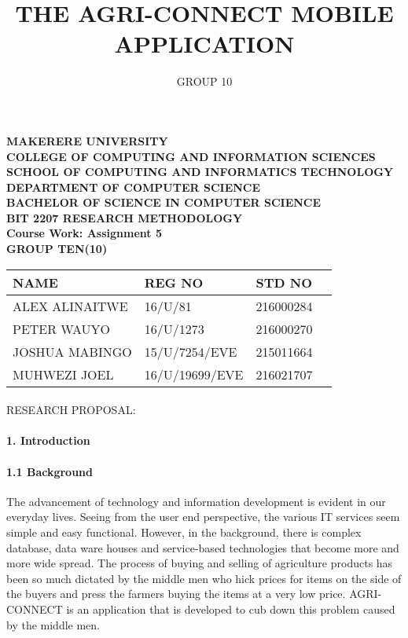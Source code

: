 \documentclass[10pt,a4paper]{report}
\author{GROUP 10}
\title{THE AGRI-CONNECT MOBILE APPLICATION}
\begin{document}
\begin{Huge}
\begin{center}
\begin{normalsize}
\textbf{MAKERERE UNIVERSITY }\\
\textbf{COLLEGE OF COMPUTING AND INFORMATION SCIENCES} \\
\textbf{SCHOOL OF COMPUTING AND INFORMATICS TECHNOLOGY} \\
\textbf{DEPARTMENT OF COMPUTER SCIENCE} \\
\textbf{BACHELOR OF SCIENCE IN COMPUTER SCIENCE} \\
\textbf{BIT 2207 RESEARCH METHODOLOGY} \\
\textbf{Course Work: Assignment 5}\\
\textbf{GROUP TEN(10)}
\end{normalsize}
\end{center}
\end{Huge}

\begin{center}
\begin{tabular}{|l|l|l|c|}
\hline NAME  & REG NO & STD NO \\\hline
ALEX ALINAITWE & 16/U/81 & 216000284 \\\hline
PETER WAUYO & 16/U/1273 & 216000270 \\\hline
JOSHUA MABINGO & 15/U/7254/EVE & 215011664 \\\hline
MUHWEZI JOEL & 16/U/19699/EVE & 216021707 \\\hline
\end{tabular}

\paragraph{}
RESEARCH PROPOSAL:
\end{center}

\newpage
\maketitle


\paragraph{1.  Introduction}
\paragraph{1.1  Background}
\begin{flushleft}
The advancement of technology and information development is evident in our everyday lives. Seeing from the user end perspective, the various IT services seem simple and easy functional. However, in the background, there is complex database, data ware houses and service-based technologies that become more and more wide spread. The process of buying and selling of agriculture products has been so much dictated by the middle men who hick prices for items on the side of the buyers and press the farmers buying the items at a very low price. AGRI-CONNECT is an application that is developed to cub down this problem caused by the middle men.
\end{flushleft}
\end{document}

